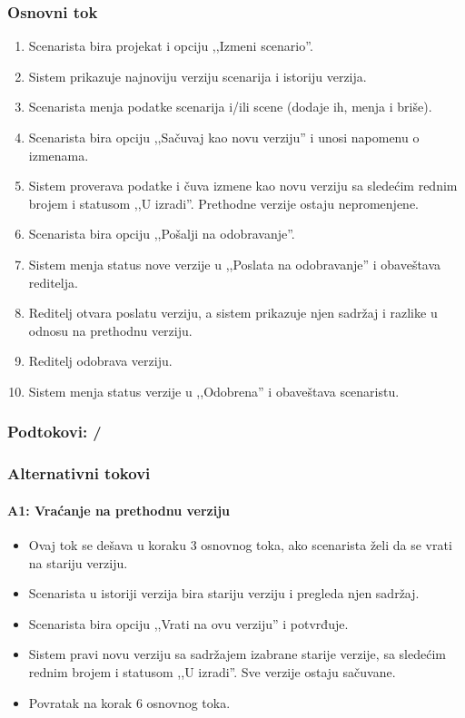 \subsubsection*{Osnovni tok}
\begin{enumerate}
    \item Scenarista bira projekat i opciju ,,Izmeni scenario''.
    \item Sistem prikazuje najnoviju verziju scenarija i istoriju verzija.
    \item Scenarista menja podatke scenarija i/ili scene (dodaje ih, menja i briše).
    \item Scenarista bira opciju ,,Sačuvaj kao novu verziju'' i unosi napomenu o izmenama.
    \item Sistem proverava podatke i čuva izmene kao novu verziju sa sledećim rednim brojem i statusom ,,U izradi''. Prethodne verzije ostaju nepromenjene.
    \item Scenarista bira opciju ,,Pošalji na odobravanje''.
    \item Sistem menja status nove verzije u ,,Poslata na odobravanje'' i obaveštava reditelja.
    \item Reditelj otvara poslatu verziju, a sistem prikazuje njen sadržaj i razlike u odnosu na prethodnu verziju.
    \item Reditelj odobrava verziju.
    \item Sistem menja status verzije u ,,Odobrena'' i obaveštava scenaristu.
\end{enumerate}

\subsubsection*{Podtokovi: /}

\subsubsection*{Alternativni tokovi}

\paragraph*{A1: Vraćanje na prethodnu verziju}
\begin{itemize}
    \item Ovaj tok se dešava u koraku 3 osnovnog toka, ako scenarista želi da se vrati na stariju verziju.
    \item Scenarista u istoriji verzija bira stariju verziju i pregleda njen sadržaj.
    \item Scenarista bira opciju ,,Vrati na ovu verziju'' i potvrđuje.
    \item Sistem pravi novu verziju sa sadržajem izabrane starije verzije, sa sledećim rednim brojem i statusom ,,U izradi''. Sve verzije ostaju sačuvane.
    \item Povratak na korak 6 osnovnog toka.
\end{itemize}

